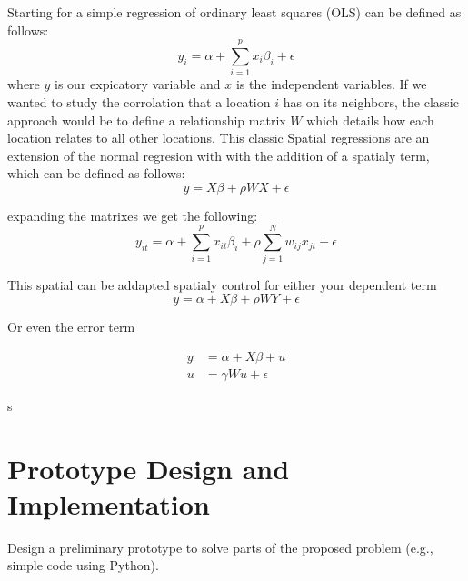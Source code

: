 \documentclass{article}
\begin{document}
Starting for a simple regression of ordinary least squares (OLS) can be defined as follows:
\begin{equation}
  y_i = \alpha + \sum^p_{i=1} x_i \beta_i + \epsilon
  \label{eq:OLS}
\end{equation}
where $y$ is our expicatory variable and $x$ is the independent variables. If we wanted to study the corrolation that a location $i$ has on its neighbors, the classic approach would be 
to define a relationship matrix $W$ which details how each location relates to all other locations. This classic Spatial regressions are an extension of the normal regresion with with 
the addition of a spatialy term, which can be defined as follows:
\begin{equation}
	y = X \beta + \rho W X + \epsilon
	\label{eq:SDM}
\end{equation}

expanding the matrixes we get the following:
\begin{equation}
  y_{it} = \alpha + \sum^p_{i=1} x_{it} \beta_i + \rho \sum^N_{j=1} w_{ij} x_{jt} +\epsilon
  \label{eq:SDM_exp}
\end{equation}

This spatial can be addapted spatialy control for either your dependent term
\begin{equation}
	y = \alpha + X \beta + \rho W Y + \epsilon
	\label{eq:SAR}
\end{equation}

Or even the error term

\begin{equation}
	\begin{split}
		y & =\alpha + X \beta + u  \\
		u & =\gamma W u + \epsilon
	\end{split}
	\label{eq:SEM}
\end{equation}

s

\section{Prototype Design and Implementation}
Design a preliminary prototype to solve parts of the proposed problem (e.g., simple code using Python).
\end{document}
